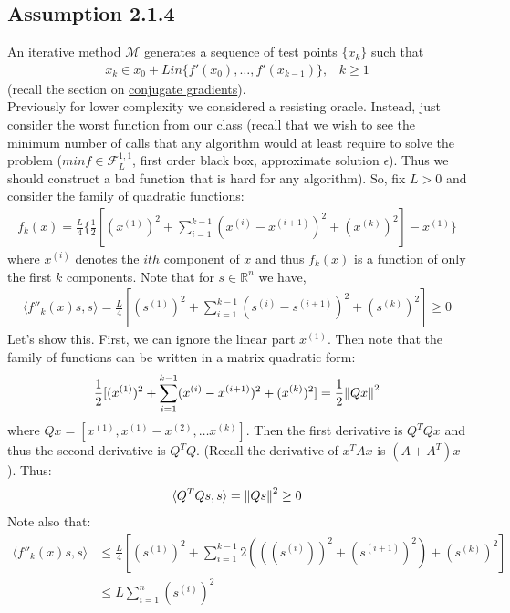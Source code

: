 \documentclass[12pt,a4paper]{article}
\begin{document}
	\subsection*{Assumption 2.1.4}\label{A214}
	An iterative method $\mathcal{M}$ generates a sequence of test points $\{x_k\}$ such that
	\begin{align*}
		x_k \in x_0 + Lin \{f'(x_0), \ldots , f'(x_{k-1})\}, \hspace{10pt} k \geq 1
	\end{align*}
	(recall the section on \hyperref[subsec:CG]{conjugate gradients}).\\
	Previously for lower complexity we considered a resisting oracle. Instead, just consider the worst function from our class (recall that we wish to see the minimum number of calls that any algorithm would at least require to solve the problem ($min f \in \mathcal{F}_L^{1,1}$, first order black box, approximate solution $\epsilon$). Thus we should construct a bad function that is hard for any algorithm). So, fix $L > 0$ and consider the family of quadratic functions:
	\begin{align*}
		f_k(x) = \frac{L}{4}\{\frac{1}{2}[(x^{(1)})^2 + \sum_{i=1}^{k-1}(x^{(i)} - x^{(i+1)})^2 + (x^{(k)})^2] - x^{(1)}\}
	\end{align*}
	where  $x^{(i)}$ denotes the $ith$ component of $x$ and thus $f_k(x)$ is a function of only the first $k$ components. Note that for $s \in \mathbb{R}^n$ we have,
	\begin{align*}
		\langle f''_k(x)s, s \rangle = \frac{L}{4}[(s^{(1)})^2 + \sum_{i=1}^{k-1}(s^{(i)} - s^{(i+1)})^2 + (s^{(k)})^2] \geq 0
	\end{align*}
	Let's show this. First, we can ignore the linear part $x^{(1)}$. Then note that the family of functions can be written in a matrix quadratic form:
	\begin{align*}
		\frac{1}{2}[(x^{(1)})^2 + \sum_{i=1}^{k-1}(x^{(i)} - x^{(i+1)})^2 + (x^{(k)})^2] =  \frac{1}{2}\norm{Qx}^2
	\end{align*}
	where $Qx = [x^{(1)}, x^{(1)} - x^{(2)}, \ldots x^{(k)}]$. Then the first derivative is $Q^TQx$ and thus the second derivative is $Q^TQ$. (Recall the derivative of $x^TAx$ is $(A + A^T)x$). Thus:
	\begin{align*}
		\langle Q^TQs, s \rangle = \norm{Qs}^2 \geq 0
	\end{align*}
	Note also that:
	\begin{align*}
	\langle f''_k(x)s, s \rangle &\leq \frac{L}{4}[(s^{(1)})^2 + \sum_{i=1}^{k-1}2(((s^{(i)}))^2 + (s^{(i+1)})^2) + (s^{(k)})^2] \\
	&\leq L \sum_{i=1}^{n}(s^{(i)})^2 
	\end{align*}
\end{document}
